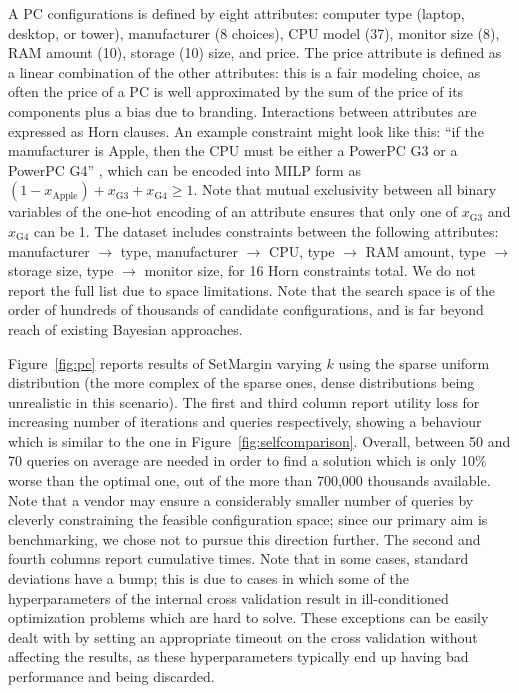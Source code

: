 \documentclass{article}
\renewcommand\[{\begin{equation}}
\renewcommand\]{\end{equation}}
\newcommand{\andrea}[1]{{\bf \textcolor{blue}{{\fbox{Andrea:} #1}}}}
\begin{document}
A PC configurations is defined by eight attributes: computer type (laptop,
desktop, or tower), manufacturer (8 choices), CPU model (37), monitor size (8), RAM amount (10), storage (10)
size, and price.
The price attribute is defined as a linear combination of the other
attributes: this is a fair modeling choice, as often the price of a PC is
well approximated by the sum of the price of its components plus a bias due to
branding.
%
Interactions between attributes are expressed as Horn clauses. An example
constraint might look like this: ``if the manufacturer is Apple, then the
CPU must be either a PowerPC G3 or a PowerPC G4''%
, which can be encoded into MILP form as
%
$ (1 - x_\text{Apple}) + x_\text{G3} + x_\text{G4} \ge 1 $.
%
Note that mutual exclusivity between all binary variables of the
one-hot encoding of an attribute ensures that only one of
$x_\text{G3}$ and $x_\text{G4}$ can be 1.  The dataset includes
constraints between the following attributes: manufacturer $\to$ type,
manufacturer $\to$ CPU, type $\to$ RAM amount, type $\to$ storage
size, type $\to$ monitor size, for 16 Horn constraints total. We do
not report the full list due to space limitations. Note that the
search space is of the order of hundreds of thousands of candidate
configurations, and is far beyond reach of existing Bayesian
approaches.

Figure~\ref{fig:pc} reports results of {\sc SetMargin} varying $k$
using the sparse uniform distribution (the more complex of the sparse
ones, dense distributions being unrealistic in this scenario). The
first and third column report utility loss for increasing number of
iterations and queries respectively, showing a behaviour which is
similar to the one in Figure~\ref{fig:selfcomparison}. Overall,
between 50 and 70 queries on average are needed in order to find  a
solution which is only 10\% worse than the optimal one, out of the
more than 700,000 thousands available. Note that a vendor may ensure a
considerably smaller number of queries by cleverly constraining the
feasible configuration space; since our primary aim is benchmarking,
we chose not to pursue this direction further.  The second and fourth
columns report cumulative times. Note that in some cases, standard
deviations have a bump; this is due to cases in which some of the
hyperparameters of the internal cross validation result in
ill-conditioned optimization problems which are hard to solve. These
exceptions can be easily dealt with by setting an appropriate timeout
on the cross validation without affecting the results, as these
hyperparameters typically end up having bad performance and being
discarded.
\end{document}
